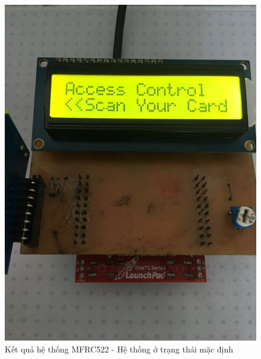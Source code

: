 \begin{figure}[ht]
\centering
\includegraphics[scale=0.3]{images/mfrc522_default.jpg}
\caption{Kết quả hệ thống MFRC522 - Hệ thống ở trạng thái mặc định}
\label{fig:rc522_default}
\end{figure}

